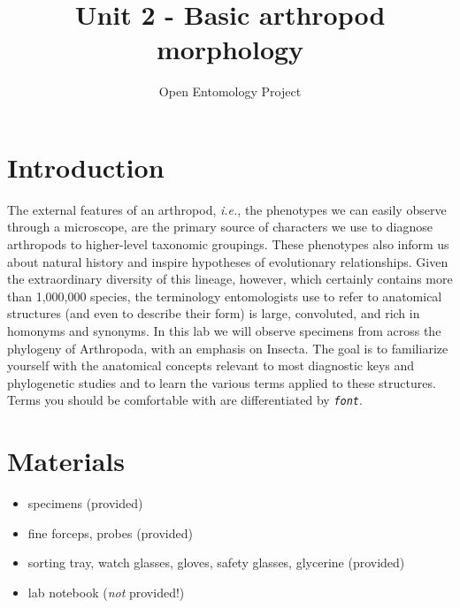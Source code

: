 \documentclass[letterpaper, 11pt]{article}
\title{Unit 2 - Basic arthropod morphology}
\author{Open Entomology Project}
\newcommand{\latinword}[1]{\texttt{\itshape #1}}%
\begin{document}
\cleanlookdateon %
\maketitle
\thispagestyle{fancy}
\section*{Introduction}
The external features of an arthropod, \textit{i.e.}, the phenotypes we can easily observe through a microscope, are the primary source of characters we use to diagnose arthropods to higher-level taxonomic groupings. These phenotypes also inform us about natural history and inspire hypotheses of evolutionary relationships. Given the extraordinary diversity of this lineage, however, which certainly contains more than 1,000,000 species, the terminology entomologists use to refer to anatomical structures (and even to describe their form) is large, convoluted, and rich in homonyms and synonyms. In this lab we will observe specimens from across the phylogeny of Arthropoda, with an emphasis on Insecta. The goal is to familiarize yourself with the anatomical concepts relevant to most diagnostic keys and phylogenetic studies and to learn the various terms applied to these structures. Terms you should be comfortable with are differentiated by \latinword{font}.

\section*{Materials}
\begin{itemize}
	\item {specimens (provided)}
	\item {fine forceps, probes (provided)}
	\item {sorting tray, watch glasses, gloves, safety glasses, glycerine (provided)}
	\item {lab notebook (\textit{not} provided!)}
\end{itemize}
\end{document}
